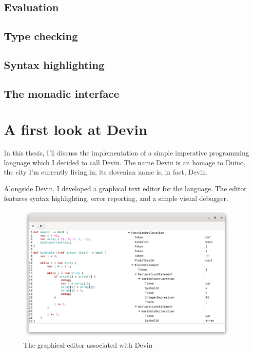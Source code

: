 \documentclass[11pt, american, draft]{PhdThesis}
\begin{document}
  \section{Evaluation}

  \section{Type checking}

  \section{Syntax highlighting}

  \section{The monadic interface}

  \chapter{A first look at Devin}

  In this thesis, I'll discuss the implementation of a simple imperative programming language which
  I decided to call Devin. The name Devin is an homage to Duino, the city I'm currently living in;
  its slovenian name is, in fact, Devin.

  Alongside Devin, I developed a graphical text editor for the language. The editor features syntax
  highlighting, error reporting, and a simple visual debugger.

  \begin{figure}[H]
    \centering
    \includegraphics[width=0.9\linewidth]{2.png}
    \caption{The graphical editor associated with Devin}
    \label{ex1}
  \end{figure}
\end{document}
